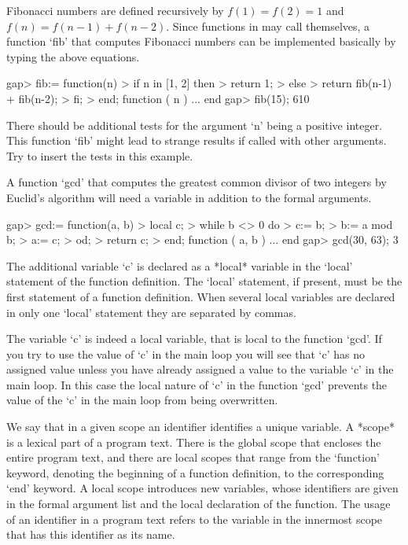 Fibonacci numbers are defined recursively by $f(1) = f(2) =  1$ and $f(n)
=  f(n-1) + f(n-2)$.  Since  functions in {\GAP} may call  themselves,  a
function  `fib'  that  computes  Fibonacci  numbers  can  be  implemented
basically by typing the above equations.

\beginexample
    gap> fib:= function(n)
    >       if n in [1, 2] then
    >          return 1;
    >       else
    >          return fib(n-1) + fib(n-2);
    >       fi;
    >    end;
    function ( n ) ... end
    gap> fib(15);
    610
\endexample

There should be additional tests for the  argument  `n' being  a positive
integer.   This  function `fib' might  lead to strange  results if called
with other arguments.  Try to insert the tests in this example.


A function   `gcd' that  computes the   greatest  common divisor   of two
integers  by Euclid's algorithm  will need a variable  in addition to the
formal arguments.

\beginexample
    gap> gcd:= function(a, b)
    >       local c;
    >       while b <> 0 do
    >          c:= b;
    >          b:= a mod b;
    >          a:= c;
    >       od;
    >       return c;
    >    end;
    function ( a, b ) ... end
    gap> gcd(30, 63);
    3
\endexample

The additional  variable `c'  is declared as  a  *local*  variable in the
`local' statement  of the function definition.  The `local' statement, if
present, must  be the first  statement of  a function  definition.   When
several local variables are  declared in only one  `local' statement they
are separated by commas.

The  variable `c'  is  indeed  a local  variable,  that  is local to  the
function `gcd'.  If you try  to use the value of `c' in the main loop you
will see that `c'  has no assigned value unless you have already assigned
a value to the variable `c'  in  the  main loop.  In this case  the local
nature of `c' in the function `gcd' prevents  the value of the `c' in the
main loop from being overwritten.

We say  that in a given scope an identifier identifies a unique variable.
A *scope* is a lexical part of a program text.  There is the global scope
that encloses  the  entire program text, and there are local  scopes that
range from the `function'  keyword, denoting the beginning of  a function
definition, to the corresponding `end' keyword.  A local scope introduces
new  variables, whose identifiers are  given in the formal argument  list
and the local declaration of the function.  The usage of an identifier in
a program text refers to  the  variable in  the  innermost scope that has
this identifier as its name.

